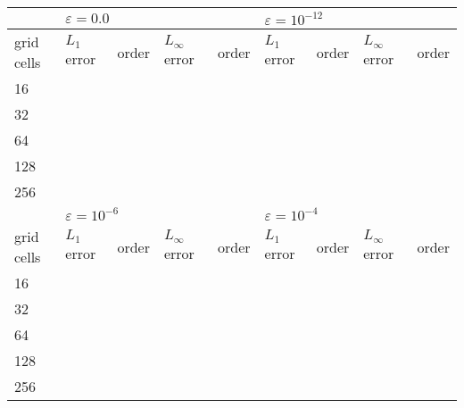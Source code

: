 \documentclass[]{article}
\begin{document}
        \begin{center}\vspace{1cm}
        \begin{tabular}{|l|l|l|l|l|l|l|l|l|}
        \hline
                   & \multicolumn{4}{l|}{$\varepsilon = 0.0$}              & \multicolumn{4}{l|}{$\varepsilon = 10^{-12}$}         \\ \hline
        grid cells & $L_{1}$ error & order & $L_{\infty}$ error & order & $L_{1}$ error & order & $L_{\infty}$ error & order \\ \hline
        16         &               &       &                    &       &               &       &                    &       \\ \hline
        32         &               &       &                    &       &               &       &                    &       \\ \hline
        64         &               &       &                    &       &               &       &                    &       \\ \hline
        128        &               &       &                    &       &               &       &                    &       \\ \hline
        256        &               &       &                    &       &               &       &                    &       \\ \hline
                   & \multicolumn{4}{l|}{$\varepsilon = 10^{-6}$}          & \multicolumn{4}{l|}{$\varepsilon = 10^{-4}$}          \\ \hline
        grid cells & $L_{1}$ error & order & $L_{\infty}$ error & order & $L_{1}$ error & order & $L_{\infty}$ error & order \\ \hline
        16         &               &       &                    &       &               &       &                    &       \\ \hline
        32         &               &       &                    &       &               &       &                    &       \\ \hline
        64         &               &       &                    &       &               &       &                    &       \\ \hline
        128        &               &       &                    &       &               &       &                    &       \\ \hline
        256        &               &       &                    &       &               &       &                    &       \\ \hline
        \end{tabular}
        \end{center}\vspace{1cm}
\end{document}
